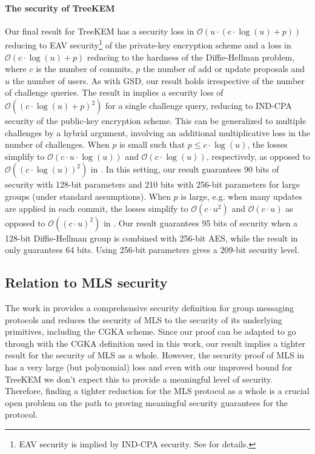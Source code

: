\paragraph{The security of TreeKEM} Our final result for TreeKEM has a security loss in $\mathcal{O}(u \cdot (c \cdot \log(u) + p))$ reducing to EAV security\footnote{EAV security is implied by IND-CPA security. See \cite[Section~\ref*{sec:security-definitions}]{full-version} for details.} of the private-key encryption scheme  and a loss in $\mathcal{O}(c \cdot \log(u) + p)$ reducing to the hardness of the Diffie-Hellman problem, where $c$ is the number of commits, $p$ the number of add or update proposals and $u$ the number of users. As with GSD, our result holds irrespective of the number of challenge queries. The result in \cite{ttkem} implies a security loss of $\mathcal{O}((c \cdot \log(u) + p)^2)$ for a single challenge query, reducing to IND-CPA security of the public-key encryption scheme. This can be generalized to multiple challenges by a hybrid argument, involving an additional multiplicative loss in the number of challenges.
When $p$ is small such that $p \le c \cdot \log(u)$, the losses simplify to $\mathcal{O}(c \cdot u \cdot \log(u))$ and $\mathcal{O}(c \cdot \log(u))$, respectively, as opposed to $\mathcal{O}((c \cdot \log(u))^2)$ in \cite{ttkem}. In this setting, our result guarantees 90 bits of security with 128-bit parameters and 210 bits with 256-bit parameters for large groups (under standard assumptions).
When $p$ is large, e.g. when many updates are applied in each commit, the losses simplify to $\mathcal{O}(c \cdot u^2)$ and $\mathcal{O}(c \cdot u)$ as opposed to $\mathcal{O}((c \cdot u)^2)$ in \cite{ttkem}. Our result guarantees 95 bits of security when a 128-bit Diffie-Hellman group is combined with 256-bit AES, while the result in \cite{ttkem} only guarantees 64 bits. Using 256-bit parameters gives a 209-bit security level.

\subsection{Relation to MLS security}
The work in \cite{modular-group-messaging} provides a comprehensive security definition for group messaging protocols and reduces the security of MLS to the security of its underlying primitives, including the CGKA scheme. Since our proof can be adapted to go through with the CGKA definition used in this work, our result implies a tighter result for the security of MLS as a whole. However, the security proof of MLS in \cite{modular-group-messaging} has a very large (but polynomial) loss and even with our improved bound for TreeKEM we don't expect this to provide a meaningful level of security. Therefore, finding a tighter reduction for the MLS protocol as a whole is a crucial open problem on the path to proving meaningful security guarantees for the protocol.
